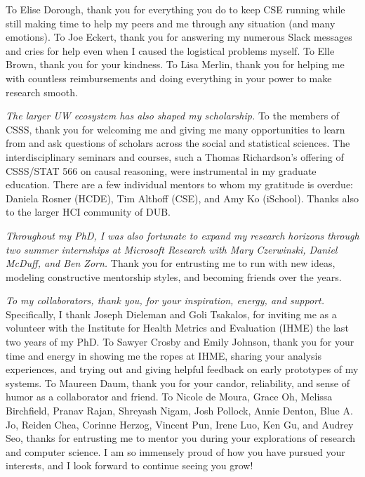 To Elise Dorough, thank you for everything you do to keep CSE running while
still making time to help my peers and me through any situation (and many
emotions). To Joe Eckert, thank you for answering my numerous Slack messages
and cries for help even when I caused the logistical problems myself. To
Elle Brown, thank you for your kindness. To Lisa Merlin, thank you for
helping me with countless reimbursements and doing everything in your power
to make research smooth. 

\textit{The larger UW ecosystem has also shaped my scholarship.} To the members
of CSSS, thank you for welcoming me and giving me many opportunities to learn
from and ask questions of scholars across the social and statistical sciences.
The interdisciplinary seminars and courses, such a Thomas Richardson's offering
of CSSS/STAT 566 on causal reasoning, were instrumental in my graduate
education. There are a few individual mentors to whom my gratitude is overdue:
Daniela Rosner (HCDE), Tim Althoff (CSE), and Amy Ko (iSchool). Thanks also to
the larger HCI community of DUB. 

\textit{Throughout my PhD, I was also fortunate to expand my research horizons
through two summer internships at Microsoft Research with Mary Czerwinski,
Daniel McDuff, and Ben Zorn.} Thank you for entrusting me to run with new ideas,
modeling constructive mentorship styles, and becoming friends over the years.

\textit{To my collaborators, thank you, for your inspiration, energy, and support.}
Specifically, I thank Joseph Dieleman and Goli Tsakalos, for inviting me as
a volunteer with the Institute for Health Metrics and Evaluation (IHME) the
last two years of my PhD. To Sawyer Crosby and Emily Johnson, thank you for
your time and energy in showing me the ropes at IHME, sharing your analysis
experiences, and trying out and giving helpful feedback on early prototypes
of my systems. To Maureen Daum, thank you for your candor, reliability, and
sense of humor as a collaborator and friend. To Nicole de Moura, Grace Oh,
Melissa Birchfield, Pranav Rajan, Shreyash Nigam, Josh Pollock, Annie
Denton, Blue A. Jo, Reiden Chea, Corinne Herzog, Vincent Pun, Irene Luo, Ken
Gu, and Audrey Seo, thanks for entrusting me to mentor you during your
explorations of research and computer science. I am so immensely proud of
how you have pursued your interests, and I look forward to continue seeing
you grow!

